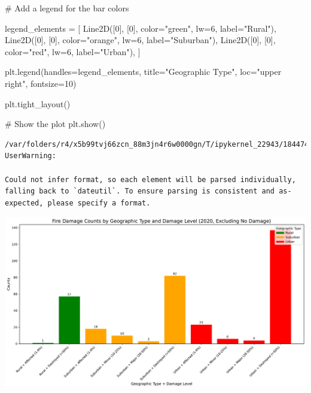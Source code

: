 \documentclass[
  letterpaper,
  DIV=11,
  numbers=noendperiod]{scrartcl}
\newenvironment{Shaded}{\begin{snugshade}}{\end{snugshade}}
\newcommand{\CommentTok}[1]{\textcolor[rgb]{0.37,0.37,0.37}{#1}}
\newcommand{\DecValTok}[1]{\textcolor[rgb]{0.68,0.00,0.00}{#1}}
\newcommand{\NormalTok}[1]{\textcolor[rgb]{0.00,0.23,0.31}{#1}}
\newcommand{\OperatorTok}[1]{\textcolor[rgb]{0.37,0.37,0.37}{#1}}
\newcommand{\StringTok}[1]{\textcolor[rgb]{0.13,0.47,0.30}{#1}}
\begin{document}
\begin{Shaded}
\begin{Highlighting}[]
\CommentTok{\# Add a legend for the bar colors}

\NormalTok{legend\_elements }\OperatorTok{=}\NormalTok{ [}
\NormalTok{    Line2D([}\DecValTok{0}\NormalTok{], [}\DecValTok{0}\NormalTok{], color}\OperatorTok{=}\StringTok{"green"}\NormalTok{, lw}\OperatorTok{=}\DecValTok{6}\NormalTok{, label}\OperatorTok{=}\StringTok{"Rural"}\NormalTok{),}
\NormalTok{    Line2D([}\DecValTok{0}\NormalTok{], [}\DecValTok{0}\NormalTok{], color}\OperatorTok{=}\StringTok{"orange"}\NormalTok{, lw}\OperatorTok{=}\DecValTok{6}\NormalTok{, label}\OperatorTok{=}\StringTok{"Suburban"}\NormalTok{),}
\NormalTok{    Line2D([}\DecValTok{0}\NormalTok{], [}\DecValTok{0}\NormalTok{], color}\OperatorTok{=}\StringTok{"red"}\NormalTok{, lw}\OperatorTok{=}\DecValTok{6}\NormalTok{, label}\OperatorTok{=}\StringTok{"Urban"}\NormalTok{),}
\NormalTok{]}

\NormalTok{plt.legend(handles}\OperatorTok{=}\NormalTok{legend\_elements, title}\OperatorTok{=}\StringTok{"Geographic Type"}\NormalTok{,}
\NormalTok{           loc}\OperatorTok{=}\StringTok{"upper right"}\NormalTok{, fontsize}\OperatorTok{=}\DecValTok{10}\NormalTok{)}

\NormalTok{plt.tight\_layout()}

\CommentTok{\# Show the plot}
\NormalTok{plt.show()}
\end{Highlighting}
\end{Shaded}

\begin{verbatim}
/var/folders/r4/x5b99tvj66zcn_88m3jn4r6w0000gn/T/ipykernel_22943/1844741617.py:3: UserWarning:

Could not infer format, so each element will be parsed individually, falling back to `dateutil`. To ensure parsing is consistent and as-expected, please specify a format.
\end{verbatim}

\includegraphics{Final Code_files/figure-pdf/cell-12-output-2.pdf}
\end{document}
